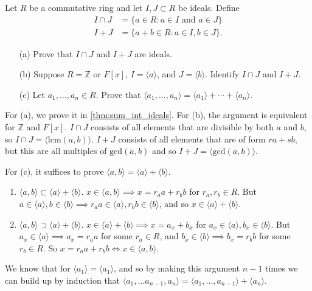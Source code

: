   \begin{exercise}[Shifrin 4.1.17]
    Let $R$ be a commutative ring and let $I,J \subset R$ be ideals. Define
    \begin{align*}
      I \cap J &= \{a \in R : a \in I \text{ and } a \in J\}\\
      I + J &= \{a + b \in R : a \in I, b \in J\}.
    \end{align*}
    \begin{enumerate}
      \item[(a)] Prove that $I \cap J$ and $I + J$ are ideals.
      \item[(b)] Suppose $R = \mathbb{Z}$ or $F[x]$, $I = \langle a \rangle$, and $J = \langle b \rangle$. Identify $I \cap J$ and $I + J$.
      \item[(c)] Let $a_1,\ldots,a_n \in R$. Prove that $\langle a_1,\ldots,a_n \rangle = \langle a_1 \rangle + \cdots + \langle a_n \rangle$.
    \end{enumerate}
  \end{exercise}
  \begin{solution}
    For (a), we prove it in \ref{thm:sum_int_ideals}. For (b), the argument is equivalent for $\mathbb{Z}$ and $F[x]$. $I \cap J$ consists of all elements that are divisible by both $a$ and $b$, so $I \cap J = \langle \mathrm{lcm}(a, b) \rangle$. $I + J$ consists of all elements that are of form $r a + s b$, but this are all multiples of $\mathrm{gcd}(a, b)$ and so $I + J = \langle \mathrm{gcd}(a, b) \rangle$. 

    For (c), it suffices to prove $\langle a, b \rangle = \langle a \rangle + \langle b \rangle$. 
    \begin{enumerate}
      \item $\langle a, b \rangle \subset \langle a \rangle + \langle b \rangle$. $x \in \langle a, b \rangle \implies x = r_a a + r_b b$ for $r_a, r_b \in R$. But $a \in \langle a \rangle, b \in \langle b \rangle \implies r_a a \in \langle a \rangle, r_b b \in \langle b \rangle$, and so $x \in \langle a \rangle + \langle b \rangle$. 

    \item $\langle a, b \rangle \supset \langle a \rangle + \langle b \rangle$. $x \in \langle a \rangle + \langle b \rangle \implies x = a_x + b_x$ for $a_x \in \langle a \rangle, b_x \in \langle b \rangle$. But $a_x \in \langle a \rangle \implies a_x = r_a a$ for some $r_a \in R$, and $b_x \in \langle b \rangle \implies b_x = r_b b$ for some $r_b \in R$. So $x = r_a a + r_b b \iff x \in \langle a, b \rangle$. 
    \end{enumerate}
    We know that for $\langle a_1 \rangle = \langle a_1 \rangle$, and so by making this argument $n-1$ times we can build up by induction that $\langle a_1, \ldots a_{n-1}, a_n \rangle = \langle a_1, \ldots, a_{n-1} \rangle + \langle a_n \rangle$. 
  \end{solution}


